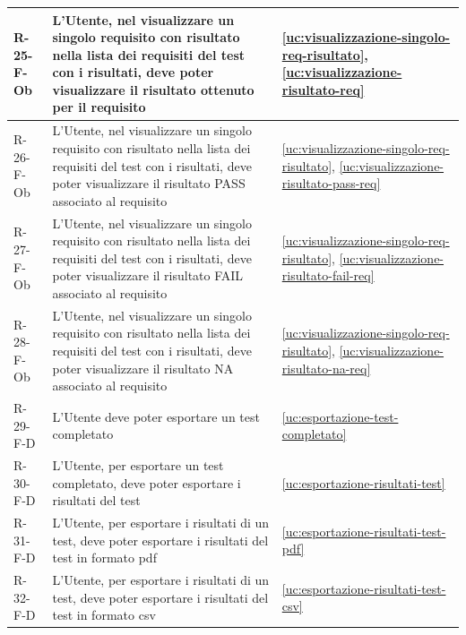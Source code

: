 ﻿\documentclass[a4paper,12pt]{article}
\begin{document}
{{\begin{longtable}{|l|p{}|p{}|}
            R-25-F-Ob       & L'Utente, nel visualizzare un singolo requisito con risultato nella lista dei requisiti del test con i risultati, deve poter visualizzare il risultato ottenuto per il requisito            & \ref{uc:visualizzazione-singolo-req-risultato}, \ref{uc:visualizzazione-risultato-req} \\ \hline
            R-26-F-Ob       & L'Utente, nel visualizzare un singolo requisito con risultato nella lista dei requisiti del test con i risultati, deve poter visualizzare il risultato PASS associato al requisito            & \ref{uc:visualizzazione-singolo-req-risultato}, \ref{uc:visualizzazione-risultato-pass-req} \\ \hline
            R-27-F-Ob       & L'Utente, nel visualizzare un singolo requisito con risultato nella lista dei requisiti del test con i risultati, deve poter visualizzare il risultato FAIL associato al requisito       & \ref{uc:visualizzazione-singolo-req-risultato}, \ref{uc:visualizzazione-risultato-fail-req} \\ \hline
            R-28-F-Ob       & L'Utente, nel visualizzare un singolo requisito con risultato nella lista dei requisiti del test con i risultati, deve poter visualizzare il risultato NA associato al requisito         & \ref{uc:visualizzazione-singolo-req-risultato}, \ref{uc:visualizzazione-risultato-na-req} \\ \hline
            R-29-F-D        & L'Utente deve poter esportare un test completato                                                                                                                                            & \ref{uc:esportazione-test-completato}                                               \\ \hline
            R-30-F-D        & L'Utente, per esportare un test completato, deve poter esportare i risultati del test   & \ref{uc:esportazione-risultati-test}                                               \\ \hline
            R-31-F-D        & L'Utente, per esportare i risultati di un test, deve poter esportare i risultati del test in formato pdf   & \ref{uc:esportazione-risultati-test-pdf}                                               \\ \hline
            R-32-F-D        & L'Utente, per esportare i risultati di un test, deve poter esportare i risultati del test in formato csv   & \ref{uc:esportazione-risultati-test-csv}                                               \\ \hline

\end{longtable}}}
\end{document}
